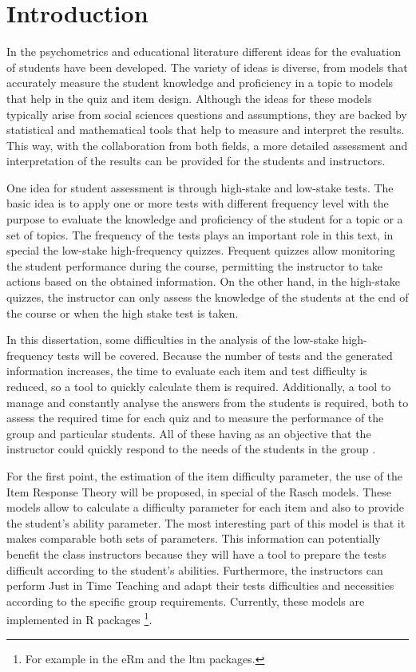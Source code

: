 \chapter{Introduction}

In the psychometrics and educational literature different ideas for the evaluation of students have been developed. The variety of ideas is diverse, from models that accurately measure the student knowledge and proficiency in a topic to models that help in the quiz and item design. Although the ideas for these models typically arise from social sciences questions and assumptions, they are backed by statistical and mathematical tools that help to measure and interpret the results. This way, with the collaboration from both fields, a more detailed assessment and interpretation of the results can be provided for the students and instructors.


One idea for student assessment is through high-stake and low-stake tests. The basic idea is to apply one or more tests with different frequency level with the purpose to evaluate the knowledge and proficiency of the student for a topic or a set of topics. The frequency of the tests plays an important role in this text, in special the low-stake high-frequency quizzes. Frequent quizzes allow monitoring the student performance during the course, permitting the instructor to take actions based on the obtained information. On the other hand, in the high-stake quizzes, the instructor can only assess the knowledge of the students at the end of the course or when the high stake test is taken.

In this dissertation, some difficulties in the analysis of the low-stake high-frequency tests will be covered. Because the number of tests and the generated information increases, the time to evaluate each item and test difficulty is reduced, so a tool to quickly calculate them is required. Additionally, a tool to manage and constantly analyse the answers from the students is required, both to assess the required time for each quiz and to measure the performance of the group and particular students. All of these having as an objective that the instructor could quickly respond to the needs of the students in the group \cite{payne2009information} \cite{moodle}.

For the first point, the estimation of the item difficulty parameter, the use of the Item Response Theory will be proposed, in special of the Rasch models. These models allow to calculate a difficulty parameter for each item and also to provide the student's ability parameter. The most interesting part of this model is that it makes comparable both sets of parameters. This information can potentially benefit the class instructors because they will have a tool to prepare the tests difficult according to the student's abilities. Furthermore, the instructors can perform Just in Time Teaching and adapt their tests difficulties and necessities according to the specific group requirements. Currently, these models are implemented in R packages \footnote{For example in the eRm and the ltm packages.}.

